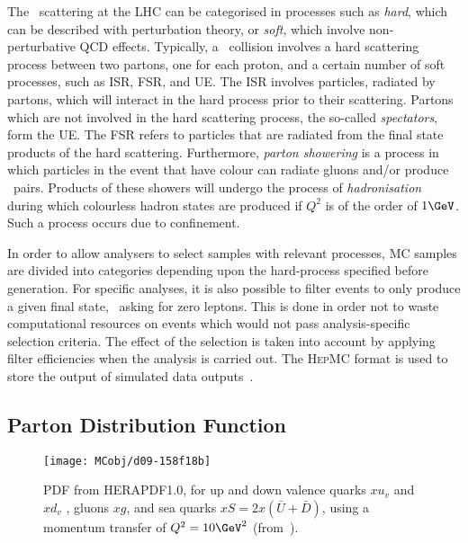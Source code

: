 		The \pp\ scattering at the \ac{LHC} can be categorised in processes such as \emph{hard}, which can be described with perturbation theory, or \emph{soft}, which involve non-perturbative \ac{QCD} effects. Typically, a \pp\ collision involves a hard scattering process between two partons, one for each proton, and a certain number of soft processes, such as \ac{ISR}, \ac{FSR}, and \ac{UE}. The \ac{ISR} involves particles, radiated by partons, which will interact in the hard process prior to their scattering. Partons which are not involved in the hard scattering process, the so-called \emph{spectators}, form the \ac{UE}. The \ac{FSR} refers to particles that are radiated from the final state products of the hard scattering. Furthermore, \emph{parton showering} is a process in which particles in the event that have colour can radiate gluons and/or produce \qqbar\ pairs. Products of these showers will undergo the process of \emph{hadronisation} during which colourless hadron states are produced if $Q^2$ is of the order of $1 \GeV$. Such a process occurs due to confinement. 

		In order to allow analysers to select samples with relevant processes, \ac{MC} samples are divided into categories depending upon the hard-process specified before generation. For specific analyses, it is also possible to filter events to only produce a given final state, \eg\ asking for zero leptons. This is done in order not to waste computational resources on events which would not pass analysis-specific selection criteria. The effect of the selection is taken into account by applying filter efficiencies when the analysis is carried out. The \textsc{HepMC} format is used to store the output of simulated data outputs~\cite{DOBBS200141}.
		

		\subsection*{Parton Distribution Function}

			\begin{wrapfigure}{R}{.5\textwidth}
				\centering
				\texttt{[image: MCobj/d09-158f18b]}
				\caption{\label{fig:HERAPDF} PDF from \textsc{HERAPDF1.0}, for up and down valence quarks $xu_v$ and $xd_v$ , gluons $xg$, and sea quarks $xS = 2x(\bar{U} + \bar{D})$, using a momentum transfer of $Q^2 =10 \GeV^2$ (from~\cite{Aaron:2009aa}).}
			\end{wrapfigure}

